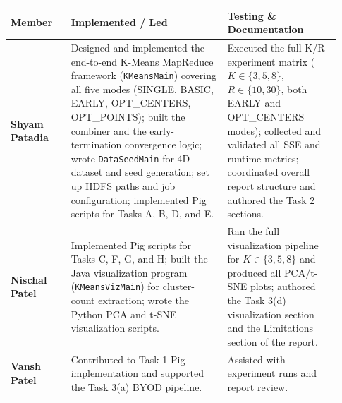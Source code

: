 \documentclass[11pt]{article}
\begin{document}
{\small
\begin{longtable}{@{}p{0.17\linewidth}p{0.44\linewidth}p{0.32\linewidth}@{}}
  \rowcolor{tableheader}
  \color{white}\textbf{Member} &
  \color{white}\textbf{Implemented / Led} &
  \color{white}\textbf{Testing \& Documentation} \\
  \midrule\endhead

  \textbf{Shyam Patadia} &
  Designed and implemented the end-to-end K-Means MapReduce framework
  (\texttt{KMeansMain}) covering all five modes (SINGLE, BASIC, EARLY,
  OPT\_CENTERS, OPT\_POINTS); built the combiner and the early-termination
  convergence logic; wrote \texttt{DataSeedMain} for 4D dataset and seed
  generation; set up HDFS paths and job configuration; implemented Pig
  scripts for Tasks A, B, D, and E. &
  Executed the full K/R experiment matrix ($K\in\{3,5,8\}$,
  $R\in\{10,30\}$, both EARLY and OPT\_CENTERS modes); collected and
  validated all SSE and runtime metrics; coordinated overall report
  structure and authored the Task 2 sections. \\[6pt]

  \textbf{Nischal Patel} &
  Implemented Pig scripts for Tasks C, F, G, and H; built the Java
  visualization program (\texttt{KMeansVizMain}) for cluster-count
  extraction; wrote the Python PCA and t-SNE visualization scripts. &
  Ran the full visualization pipeline for $K\in\{3,5,8\}$ and produced all
  PCA/t-SNE plots; authored the Task 3(d) visualization section and the
  Limitations section of the report. \\[6pt]

  \rowcolor{tablealt}
  \textbf{Vansh Patel} &
  Contributed to Task 1 Pig implementation and supported the Task 3(a)
  BYOD pipeline. &
  Assisted with experiment runs and report review. \\

\end{longtable}
\normalsize}
\end{document}
